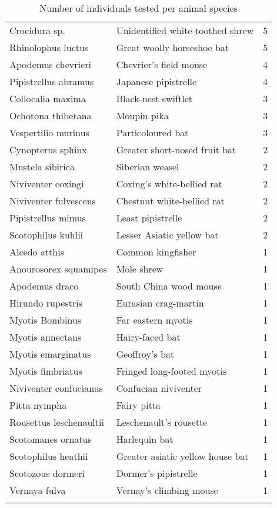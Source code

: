 \documentclass[11pt,article,oneside]{article}
\begin{document}
\begin{longtable}[c]{@{}llr@{}}
Crocidura sp. & Unidentified white-toothed shrew & 5
\\\addlinespace
Rhinolophus luctus & Great woolly horseshoe bat & 5
\\\addlinespace
Apodemus chevrieri & Chevrier's field mouse & 4
\\\addlinespace
Pipistrellus abramus & Japanese pipistrelle & 4
\\\addlinespace
Collocalia maxima & Black-nest swiftlet & 3
\\\addlinespace
Ochotona thibetana & Moupin pika & 3
\\\addlinespace
Vespertilio murinus & Particoloured bat & 3
\\\addlinespace
Cynopterus sphinx & Greater short-nosed fruit bat & 2
\\\addlinespace
Mustela sibirica & Siberian weasel & 2
\\\addlinespace
Niviventer coxingi & Coxing's white-bellied rat & 2
\\\addlinespace
Niviventer fulvescens & Chestnut white-bellied rat & 2
\\\addlinespace
Pipistrellus mimus & Least pipistrelle & 2
\\\addlinespace
Scotophilus kuhlii & Lesser Asiatic yellow bat & 2
\\\addlinespace
Alcedo atthis & Common kingfisher & 1
\\\addlinespace
Anourosorex squamipes & Mole shrew & 1
\\\addlinespace
Apodemus draco & South China wood mouse & 1
\\\addlinespace
Hirundo rupestris & Eurasian crag-martin & 1
\\\addlinespace
Myotis Bombinus & Far eastern myotis & 1
\\\addlinespace
Myotis annectans & Hairy-faced bat & 1
\\\addlinespace
Myotis emarginatus & Geoffroy's bat & 1
\\\addlinespace
Myotis fimbriatus & Fringed long-footed myotis & 1
\\\addlinespace
Niviventer confucianus & Confucian niviventer & 1
\\\addlinespace
Pitta nympha & Fairy pitta & 1
\\\addlinespace
Rousettus leschenaultii & Leschenault's rousette & 1
\\\addlinespace
Scotomanes ornatus & Harlequin bat & 1
\\\addlinespace
Scotophilus heathii & Greater asiatic yellow house bat & 1
\\\addlinespace
Scotozous dormeri & Dormer's pipistrelle & 1
\\\addlinespace
Vernaya fulva & Vernay's climbing mouse & 1
\\\addlinespace
\bottomrule
\addlinespace
\caption{Number of individuals tested per animal species}
\end{longtable}
\end{document}
